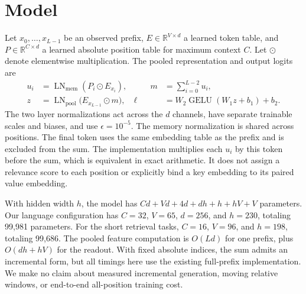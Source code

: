 \documentclass[11pt]{article}
\newcommand{\LN}{\operatorname{LN}}
\newcommand{\gelu}{\operatorname{GELU}}
\begin{document}
\section{Model}
Let \(x_0,\ldots,x_{L-1}\) be an observed prefix, \(E\in\mathbb{R}^{V\times d}\) a learned token table, and \(P\in\mathbb{R}^{C\times d}\) a learned absolute position table for maximum context \(C\). Let \(\odot\) denote elementwise multiplication. The pooled representation and output logits are
\begin{equation}
\begin{aligned}
u_i &= \LN_{\mathrm{mem}}(P_i\odot E_{x_i}),
&\qquad m &= \sum_{i=0}^{L-2}u_i, \\
z &= \LN_{\mathrm{pool}}\big(E_{x_{L-1}}\odot m\big),
&\ell &= W_2\gelu(W_1z+b_1)+b_2.
\end{aligned}
\end{equation}
The two layer normalizations act across the \(d\) channels, have separate trainable scales and biases, and use \(\epsilon=10^{-5}\). The memory normalization is shared across positions. The final token uses the same embedding table as the prefix and is excluded from the sum. The implementation multiplies each \(u_i\) by this token before the sum, which is equivalent in exact arithmetic. It does not assign a relevance score to each position or explicitly bind a key embedding to its paired value embedding.

With hidden width \(h\), the model has \(Cd+Vd+4d+dh+h+hV+V\) parameters. Our language configuration has \(C=32\), \(V=65\), \(d=256\), and \(h=230\), totaling 99,981 parameters. For the short retrieval tasks, \(C=16\), \(V=96\), and \(h=198\), totaling 99,686. The pooled feature computation is \(O(Ld)\) for one prefix, plus \(O(dh+hV)\) for the readout. With fixed absolute indices, the sum admits an incremental form, but all timings here use the existing full-prefix implementation. We make no claim about measured incremental generation, moving relative windows, or end-to-end all-position training cost.
\end{document}
